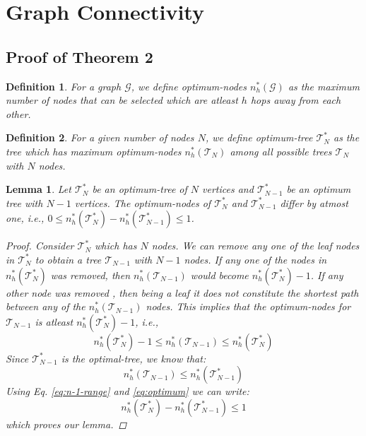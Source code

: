 \documentclass[letterpaper]{article} \usepackage{aaai20}  \usepackage{times}  \usepackage{helvet} \usepackage{courier}  \usepackage[hyphens]{url}  \usepackage{graphicx} \urlstyle{rm} \def\UrlFont{\rm}  \usepackage{graphicx}  \frenchspacing  \setlength{\pdfpagewidth}{8.5in}  \setlength{\pdfpageheight}{11in}
\newtheorem{definition}{Definition}
\newtheorem{lemma}{Lemma}
\begin{document}
	
	
	\section{Graph Connectivity}
	\subsection{\Large Proof of Theorem 2}
	\label{ssec:graph-connect-proof}
	
	\begin{definition}
		For a graph $\mathcal{G}$, we define optimum-nodes $n^{*}_{h}(\mathcal{G})$ as the maximum number of nodes that can be selected which are atleast $h$ hops away from each other.
	\end{definition}
	
	\begin{definition}
		For a given number of nodes $N$, we define optimum-tree $\mathcal{T}^{*}_{N}$ as the tree which has maximum optimum-nodes $n^{*}_{h}(\mathcal{T}_{N})$ among all possible trees $\mathcal{T}_{N}$ with $N$ nodes.
	\end{definition}
	
	
\begin{lemma}
		\label{lem:atmost-one}
		Let $\mathcal{T}^{*}_{N}$ be an optimum-tree of $N$ vertices and $\mathcal{T}^{*}_{N-1}$ be an optimum tree with $N-1$ vertices. The optimum-nodes of $\mathcal{T}^{*}_{N}$ and $\mathcal{T}^{*}_{N-1}$ differ by atmost one, i.e., $0 \le n^{*}_{h}(\mathcal{T}^{*}_{N}) - n^{*}_{h}(\mathcal{T}^{*}_{N-1}) \le 1$.
		\begin{proof}
Consider $\mathcal{T}^{*}_{N}$ which has $N$ nodes.
			We can remove any one of the leaf nodes in $\mathcal{T}^{*}_{N}$ to obtain a tree $\mathcal{T}_{N-1}$ with $N-1$ nodes. 
			If any one of the nodes in $n^{*}_{h}(\mathcal{T}^{*}_{N})$ 
			was removed, then $n^{*}_{h}(\mathcal{T}_{N-1})$ would become 
			$n^{*}_{h}(\mathcal{T}^{*}_{N}) - 1$. If any other node was removed , then being a leaf it does not constitute the shortest path between any of the $n^{*}_{h}(\mathcal{T}_{N-1})$ nodes. This implies that the optimum-nodes for $\mathcal{T}_{N-1}$ is atleast $n^{*}_{h}(\mathcal{T}^{*}_{N})-1$, i.e.,
			\begin{equation}
			\label{eq:n-1-range}
			n^{*}_{h}(\mathcal{T}^{*}_{N})-1 \le n^{*}_{h}(\mathcal{T}_{N-1}) \le n^{*}_{h}(\mathcal{T}^{*}_{N})
			\end{equation}
			Since $\mathcal{T}^{*}_{N-1}$ is the optimal-tree, we know that:
			\begin{equation}
			\label{eq:optimum}
			n^{*}_{h}(\mathcal{T}_{N-1}) \le n^{*}_{h}(\mathcal{T}^{*}_{N-1})
			\end{equation}
			Using Eq. \eqref{eq:n-1-range} and \eqref{eq:optimum}
			we can write:
			\begin{equation}
			\nonumber
			n^{*}_{h}(\mathcal{T}^{*}_{N}) - n^{*}_{h}(\mathcal{T}^{*}_{N-1}) \le 1
			\end{equation}
which proves our lemma.
		\end{proof}
	\end{lemma}
	
\end{document}
